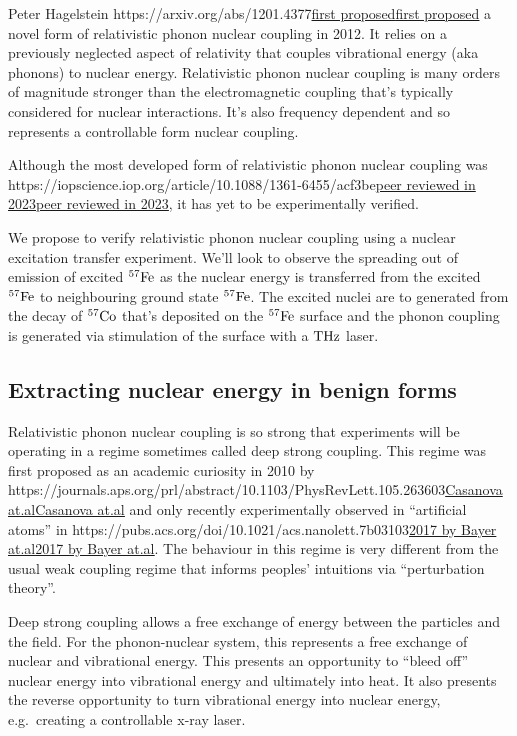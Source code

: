 \documentclass[
]{article}
\let\oldhref\href
\renewcommand{\href}[2]{\ifx#1\urlprefix\oldhref{#1}{#2}\else\uline{\oldhref{#1}{#2}}\fi}
\renewcommand{\[}{\begin{equation}}
\renewcommand{\]}{\end{equation}}
\begin{document}
Peter Hagelstein \href{https://arxiv.org/abs/1201.4377}{first proposed}
a novel form of relativistic phonon nuclear coupling in 2012. It relies
on a previously neglected aspect of relativity that couples vibrational
energy (aka phonons) to nuclear energy. Relativistic phonon nuclear
coupling is many orders of magnitude stronger than the electromagnetic
coupling that's typically considered for nuclear interactions. It's also
frequency dependent and so represents a controllable form nuclear
coupling.

Although the most developed form of relativistic phonon nuclear coupling
was
\href{https://iopscience.iop.org/article/10.1088/1361-6455/acf3be}{peer
reviewed in 2023}, it has yet to be experimentally verified.

We propose to verify relativistic phonon nuclear coupling using a
nuclear excitation transfer experiment. We'll look to observe the
spreading out of emission of excited \(\rm ^{57}Fe\) as the nuclear
energy is transferred from the excited \(\rm ^{57}Fe\) to neighbouring
ground state \(\rm ^{57}Fe\). The excited nuclei are to generated from
the decay of \(\rm ^{57}Co\) that's deposited on the \(\rm ^{57}Fe\)
surface and the phonon coupling is generated via stimulation of the
surface with a \(\rm THz\) laser.

\subsection{Extracting nuclear energy in benign
forms}\label{extracting-nuclear-energy-in-benign-forms}

Relativistic phonon nuclear coupling is so strong that experiments will
be operating in a regime sometimes called deep strong coupling. This
regime was first proposed as an academic curiosity in 2010 by
\href{https://journals.aps.org/prl/abstract/10.1103/PhysRevLett.105.263603}{Casanova
at.al} and only recently experimentally observed in ``artificial atoms''
in \href{https://pubs.acs.org/doi/10.1021/acs.nanolett.7b03103}{2017 by
Bayer at.al}. The behaviour in this regime is very different from the
usual weak coupling regime that informs peoples' intuitions via
``perturbation theory''.

Deep strong coupling allows a free exchange of energy between the
particles and the field. For the phonon-nuclear system, this represents
a free exchange of nuclear and vibrational energy. This presents an
opportunity to ``bleed off'' nuclear energy into vibrational energy and
ultimately into heat. It also presents the reverse opportunity to turn
vibrational energy into nuclear energy, e.g.~creating a controllable
x-ray laser.
\end{document}
